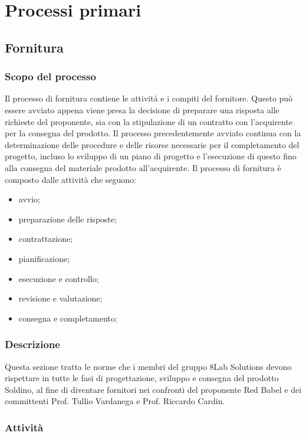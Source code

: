 \section{Processi primari}
\subsection{Fornitura}
\subsubsection{Scopo del processo}
Il processo di fornitura contiene le attività e i compiti del fornitore. Questo può essere avviato appena viene presa la decisione di preparare una risposta alle richieste del proponente, sia con la stipulazione di un contratto con l'acquirente per la consegna del prodotto.
Il processo precedentemente avviato continua con la determinazione delle procedure e delle risorse necessarie per il completamento del progetto, incluso lo sviluppo di un piano di progetto e l'esecuzione di questo fino alla consegna del materiale prodotto all'acquirente.
Il processo di fornitura è composto dalle attività che seguono:
\begin{itemize}
	\item avvio;
	\item preparazione delle risposte;
	\item contrattazione;
	\item pianificazione;
	\item esecuzione e controllo;
	\item revisione e valutazione;
	\item consegna e completamento;
\end{itemize}
\subsubsection{Descrizione}
Questa sezione tratta le norme che i membri del gruppo 8Lab Solutions devono rispettare in tutte le fasi di progettazione, sviluppo e consegna del prodotto Soldino, al fine di diventare fornitori nei confronti del proponente Red Babel e dei committenti Prof. Tullio Vardanega e Prof. Riccardo Cardin.
\subsubsection{Attività}
